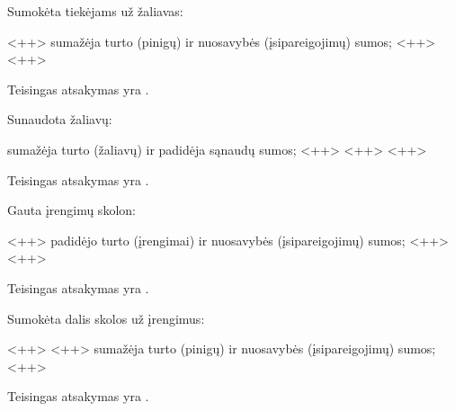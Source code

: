 \begin{tasks}
  \begin{task}
    \begin{condition}
      Sumokėta tiekėjams už žaliavas:
      \begin{enumerate}
         <++>
         sumažėja turto (pinigų) ir nuosavybės (įsipareigojimų)
          sumos;
         <++>
         <++>
      \end{enumerate}
    \end{condition}
    \begin{solution}
      Teisingas atsakymas yra .
    \end{solution}
  \end{task}

  \begin{task}
    \begin{condition}
      Sunaudota žaliavų:
      \begin{enumerate}
         sumažėja turto (žaliavų) ir padidėja sąnaudų sumos;
         <++>
         <++>
         <++>
      \end{enumerate}
    \end{condition}
    \begin{solution}
      Teisingas atsakymas yra .
    \end{solution}
  \end{task}

  \begin{task}
    \begin{condition}
      Gauta įrengimų skolon:
      \begin{enumerate}
         <++>
         padidėjo turto (įrengimai) ir nuosavybės
          (įsipareigojimų) sumos;
         <++>
         <++>
      \end{enumerate}
    \end{condition}
    \begin{solution}
      Teisingas atsakymas yra .
    \end{solution}
  \end{task}

  \begin{task}
    \begin{condition}
      Sumokėta dalis skolos už įrengimus:
      \begin{enumerate}
         <++>
         <++>
         sumažėja turto (pinigų) ir nuosavybės (įsipareigojimų)
          sumos;
         <++>
      \end{enumerate}
    \end{condition}
    \begin{solution}
      Teisingas atsakymas yra .
    \end{solution}
  \end{task}


\end{tasks}
